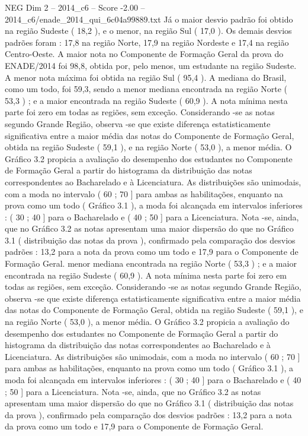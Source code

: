 \begin{textsample}{NEG Dim 2 – 2014\_c6 – Score -2.00 – 2014\_c6/enade\_2014\_qui\_6c04a99889.txt}
Já o maior desvio padrão foi obtido na região Sudeste ( 18,2 ), e o menor, na região Sul ( 17,0 ).
Os demais desvios padrões foram : 17,8 na região Norte, 17,9 na região Nordeste e 17,4 na região Centro-Oeste.
A maior nota no Componente de Formação Geral da prova do ENADE/2014 foi 98,8, obtida por, pelo menos, um estudante na região Sudeste.
A menor nota máxima foi obtida na região Sul ( 95,4 ).
A mediana do Brasil, como um todo, foi 59,3, sendo a menor mediana encontrada na região Norte ( 53,3 ) ; e a maior encontrada na região Sudeste ( 60,9 ).
A nota mínima nesta parte foi zero em todas as regiões, sem exceção.
Considerando -se as notas segundo Grande Região, observa -se que existe diferença estatisticamente significativa entre a maior média das notas do Componente de Formação Geral, obtida na região Sudeste ( 59,1 ), e na região Norte ( 53,0 ), a menor média.
O Gráfico 3.2 propicia a avaliação do desempenho dos estudantes no Componente de Formação Geral a partir do histograma da distribuição das notas correspondentes ao Bacharelado e à Licenciatura.
As distribuições são unimodais, com a moda no intervalo ( 60 ; 70 ] para ambas as habilitações, enquanto na prova como um todo ( Gráfico 3.1 ), a moda foi alcançada em intervalos inferiores : ( 30 ; 40 ] para o Bacharelado e ( 40 ; 50 ] para a Licenciatura.
Nota -se, ainda, que no Gráfico 3.2 as notas apresentam uma maior dispersão do que no Gráfico 3.1 ( distribuição das notas da prova ), confirmado pela comparação dos desvios padrões : 13,2 para a nota da prova como um todo e 17,9 para o Componente de Formação Geral. menor mediana encontrada na região Norte ( 53,3 ) ; e a maior encontrada na região Sudeste ( 60,9 ).
A nota mínima nesta parte foi zero em todas as regiões, sem exceção.
Considerando -se as notas segundo Grande Região, observa -se que existe diferença estatisticamente significativa entre a maior média das notas do Componente de Formação Geral, obtida na região Sudeste ( 59,1 ), e na região Norte ( 53,0 ), a menor média.
O Gráfico 3.2 propicia a avaliação do desempenho dos estudantes no Componente de Formação Geral a partir do histograma da distribuição das notas correspondentes ao Bacharelado e à Licenciatura.
As distribuições são unimodais, com a moda no intervalo ( 60 ; 70 ] para ambas as habilitações, enquanto na prova como um todo ( Gráfico 3.1 ), a moda foi alcançada em intervalos inferiores : ( 30 ; 40 ] para o Bacharelado e ( 40 ; 50 ] para a Licenciatura.
Nota -se, ainda, que no Gráfico 3.2 as notas apresentam uma maior dispersão do que no Gráfico 3.1 ( distribuição das notas da prova ), confirmado pela comparação dos desvios padrões : 13,2 para a nota da prova como um todo e 17,9 para o Componente de Formação Geral.

\end{textsample}
